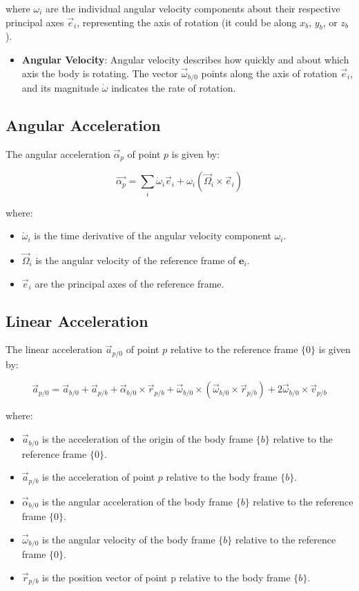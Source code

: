 where \( \omega_i \) are the individual angular velocity components about their respective principal axes \( \vec{e}_i \), representing the axis of rotation (it could be along $x_b$, $y_b$, or $z_b$).

\begin{itemize}
     \item \textbf{Angular Velocity}: Angular velocity describes how quickly and about which axis the body is rotating. The vector \( \vec{\omega}_{b/0} \) points along the axis of rotation \( \vec{e}_i \), and its magnitude \( \dot{\omega} \) indicates the rate of rotation.
\end{itemize}

\subsection{Angular Acceleration}

The angular acceleration \( \vec{\alpha}_{p} \) of point \( p \) is given by:

\[
\vec{\alpha_{p}} = \sum_{i} \dot{\omega}_i \vec{e}_i + \omega_i (\vec{\Omega}_i \times \vec{e}_i)
\]

where:
\begin{itemize}
    \item \( \dot{\omega}_i \) is the time derivative of the angular velocity component \( \omega_i \).
    \item \( \vec{\Omega}_i \) is the angular velocity of the reference frame of \( \mathbf{e}_i \).
    \item \( \vec{e}_i \) are the principal axes of the reference frame.
\end{itemize}

\subsection{Linear Acceleration}

The linear acceleration \( \vec{a}_{p/0} \) of point \( p \) relative to the reference frame \( \{0\} \) is given by:

\[
\vec{a}_{p/0} = \vec{a}_{b/0} + \vec{a}_{p/b} + \vec{\alpha}_{b/0} \times \vec{r}_{p/b} + \vec{\omega}_{b/0} \times (\vec{\omega}_{b/0} \times \vec{r}_{p/b}) + 2 \vec{\omega}_{b/0} \times \vec{v}_{p/b}
\]

where:
\begin{itemize}
    \item \( \vec{a}_{b/0} \) is the acceleration of the origin of the body frame \( \{b\} \) relative to the reference frame \( \{0\} \).
    \item \( \vec{a}_{p/b} \) is the acceleration of point \( p \) relative to the body frame \( \{b\} \).
    \item \( \vec{\alpha}_{b/0} \) is the angular acceleration of the body frame \( \{b\} \) relative to the reference frame \( \{0\} \).
    \item \( \vec{\omega}_{b/0} \) is the angular velocity of the body frame \( \{b\} \) relative to the reference frame \( \{0\} \).
    \item \( \vec{r}_{p/b} \) is the position vector of point p relative to the body frame \( \{b\} \).
\end{itemize}

